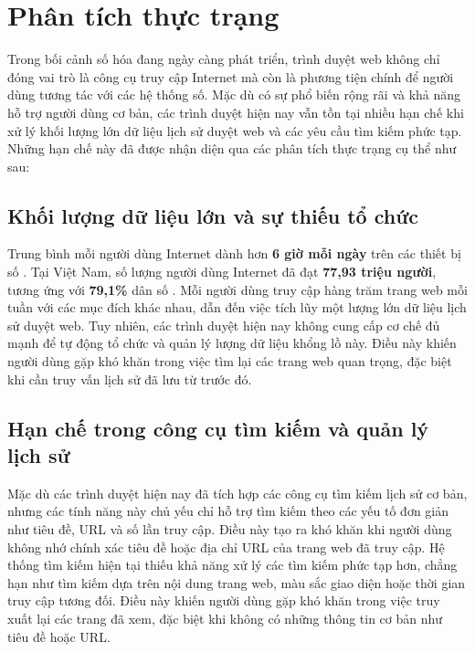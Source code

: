 \section{Phân tích thực trạng}

Trong bối cảnh số hóa đang ngày càng phát triển, trình duyệt web không chỉ đóng vai trò là công cụ truy cập Internet mà còn là phương tiện chính để người dùng tương tác với các hệ thống số. Mặc dù có sự phổ biến rộng rãi và khả năng hỗ trợ người dùng cơ bản, các trình duyệt hiện nay vẫn tồn tại nhiều hạn chế khi xử lý khối lượng lớn dữ liệu lịch sử duyệt web và các yêu cầu tìm kiếm phức tạp. Những hạn chế này đã được nhận diện qua các phân tích thực trạng cụ thể như sau:

\subsection{Khối lượng dữ liệu lớn và sự thiếu tổ chức}
Trung bình mỗi người dùng Internet dành hơn \textbf{6 giờ mỗi ngày} trên các thiết bị số \cite{datareportal2024vietnam}. Tại Việt Nam, số lượng người dùng Internet đã đạt \textbf{77,93 triệu người}, tương ứng với \textbf{79,1\%} dân số \cite{datareportal2024vietnam}. Mỗi người dùng truy cập hàng trăm trang web mỗi tuần với các mục đích khác nhau, dẫn đến việc tích lũy một lượng lớn dữ liệu lịch sử duyệt web. Tuy nhiên, các trình duyệt hiện nay không cung cấp cơ chế đủ mạnh để tự động tổ chức và quản lý lượng dữ liệu khổng lồ này. Điều này khiến người dùng gặp khó khăn trong việc tìm lại các trang web quan trọng, đặc biệt khi cần truy vấn lịch sử đã lưu từ trước đó.

\subsection{Hạn chế trong công cụ tìm kiếm và quản lý lịch sử}

Mặc dù các trình duyệt hiện nay đã tích hợp các công cụ tìm kiếm lịch sử cơ bản, nhưng các tính năng này chủ yếu chỉ hỗ trợ tìm kiếm theo các yếu tố đơn giản như tiêu đề, URL và số lần truy cập. Điều này tạo ra khó khăn khi người dùng không nhớ chính xác tiêu đề hoặc địa chỉ URL của trang web đã truy cập. Hệ thống tìm kiếm hiện tại thiếu khả năng xử lý các tìm kiếm phức tạp hơn, chẳng hạn như tìm kiếm dựa trên nội dung trang web, màu sắc giao diện hoặc thời gian truy cập tương đối. Điều này khiến người dùng gặp khó khăn trong việc truy xuất lại các trang đã xem, đặc biệt khi không có những thông tin cơ bản như tiêu đề hoặc URL. 

